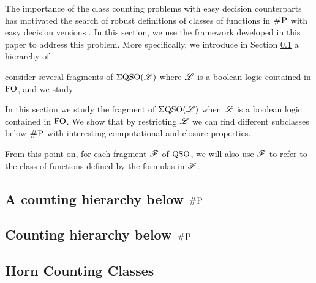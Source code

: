 The importance of the class counting problems with easy decision counterparts has motivated the search of robust definitions of classes of functions in $\text{\sc \#P}$ with easy decision versions \cite{PagourtzisZ06}. In this section, we use the framework developed in this paper to address this problem. More specifically, we introduce in Section \ref{sec-hier-shp} a hierarchy of 


consider several fragments of $\Sigma{\rm QSO}(\mathscr{L})$ where $\mathscr{L}$ is a boolean logic contained in ${\rm FO}$, and we study 






In this section we study the fragment of $\Sigma{\rm QSO}(\mathscr{L})$ when $\mathscr{L}$ is a boolean logic contained in ${\rm FO}$. We show that by restricting $\mathscr{L}$ we can find different subclasses below $\text{\sc \#P}$ with interesting computational and closure properties. 

\cite{OH93,FH08}

From this point on, for each fragment $\mathscr{F}$ of ${\rm QSO}$, we will also use $\mathscr{F}$ to refer to the class of functions defined by the formulas in $\mathscr{F}$.

\subsection{A counting hierarchy below $\text{\sc \#P}$}
\label{sec-hier-shp}


\subsection{Counting hierarchy below $\text{\sc \#P}$}


\subsection{Horn Counting Classes}

